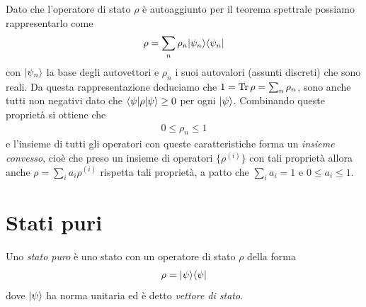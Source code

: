 Dato che l'operatore di stato $ \rho $ è autoaggiunto per il teorema spettrale possiamo rappresentarlo come 
\begin{align*}
  \rho = \sum_n \rho_n \vert \psi_n \rangle \langle \psi_n \vert
\end{align*}
con $ \vert \psi_n \rangle $ la base degli autovettori e $ \rho_n $ i suoi autovalori (assunti discreti) che sono reali. Da questa rappresentazione deduciamo che 
$ 1 = \operatorname{\textnormal{Tr}} \rho = \sum_n \rho_n $, sono anche tutti non negativi dato che $ \langle \psi \vert \rho \vert \psi \rangle \geq 0 $ per ogni $ \vert \psi \rangle $. Combinando queste 
proprietà si ottiene che 
\begin{align*}
  0 \leq \rho_n \leq 1
\end{align*}
e l'insieme di tutti gli operatori con queste caratteristiche forma un \textit{insieme convesso}, cioè che preso un insieme di operatori 
$ \{\rho^{(i)}\} $ con tali proprietà allora anche $ \rho = \sum_{i} a_i \rho^{(i)} $ rispetta tali proprietà, a patto che $ \sum_i a_i = 1 $ e 
$ 0 \leq a_i \leq 1 $.

\section{Stati puri}

\begin{definition}[  ]
  Uno \textit{stato puro} è uno stato con un operatore di stato $ \rho $ della forma 
  \begin{align*}
    \rho = \vert \psi \rangle \langle \psi \vert 
  \end{align*}
  dove $ \vert \psi \rangle $ ha norma unitaria ed è detto \textit{vettore di stato}.
\end{definition}

